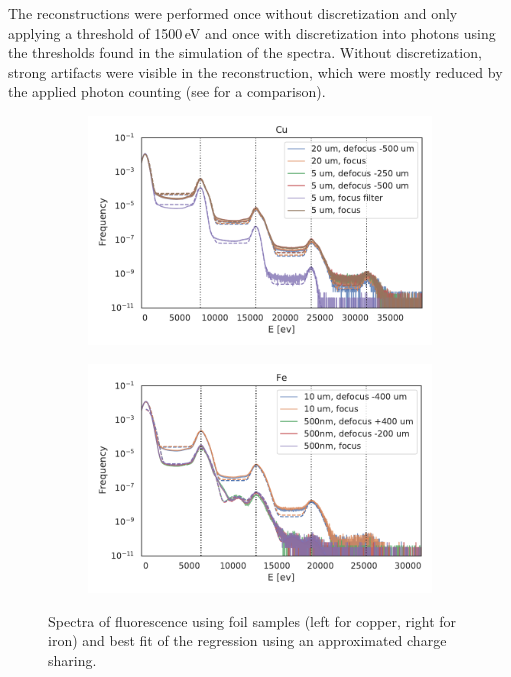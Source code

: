 The reconstructions were performed once without discretization and only applying a threshold of 1500\,eV and once with discretization into photons using the thresholds found in the simulation of the spectra. Without discretization, strong artifacts were visible in the reconstruction, which were mostly reduced by the applied photon counting (see  for a comparison).

\begin{figure}
	\centering
	\begin{subfigure}[b]{0.49\textwidth}
		\includegraphics[width=\linewidth]{images/spectrum_foil_cu.pdf}
	\end{subfigure}
	\begin{subfigure}[b]{0.49\textwidth}
		\includegraphics[width=\linewidth]{images/spectrum_foil_fe.pdf}
	\end{subfigure}
	\caption[Spectra of fluorescence using foil samples ]{Spectra of fluorescence using foil samples (left for copper, right for iron) and best fit of the regression using an approximated charge sharing.}
	\label{fig:spectrafoil}
\end{figure}


